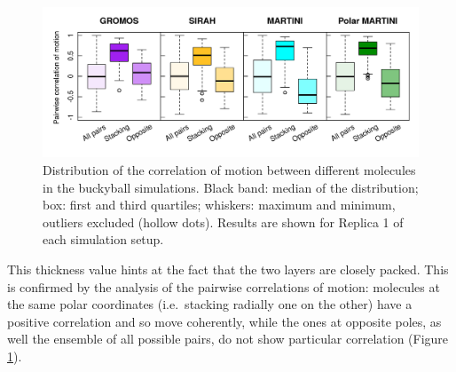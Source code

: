 \begin{figure}[t]
\centering
\includegraphics[width=0.95\linewidth]{3results_capsule/pics/RKGBcorr_boxplot_all.png} 
\caption[Correlation of motion between molecules of the buckyball]{Distribution of the correlation of motion between different molecules in the buckyball simulations. Black band: median of the distribution; box: first and third quartiles; whiskers: maximum and minimum, outliers excluded (hollow dots). Results are shown for Replica 1 of each simulation setup.}
\label{fig:BTI_corr}
\end{figure}
%
This thickness value hints at the fact that the two layers are closely packed. This is confirmed by the analysis of the pairwise correlations of motion:
%
molecules at the same polar coordinates (i.e.\ stacking radially one on the other) have a positive correlation and so move coherently, while the ones at opposite poles, as well the ensemble of all possible pairs, do not show particular correlation (Figure \ref{fig:BTI_corr}). 

